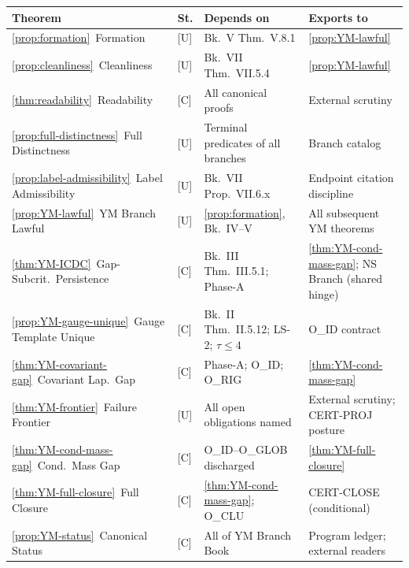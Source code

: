 \documentclass[12pt,oneside]{amsbook}
\theoremstyle{plain}
\theoremstyle{definition}
\theoremstyle{remark}
\begin{document}
\renewcommand{\arraystretch}{1.4}
\noindent
\begin{tabular}{@{}p{4.0cm}p{0.8cm}p{3.4cm}p{4.4cm}@{}}
\hline
\textbf{Theorem} & \textbf{St.} & \textbf{Depends on} & \textbf{Exports to} \\
\hline
\ref{prop:formation}\ Formation
 & [U] & Bk.~V Thm.~V.8.1
 & \ref{prop:YM-lawful} \\

\ref{prop:cleanliness}\ Cleanliness
 & [U] & Bk.~VII Thm.~VII.5.4
 & \ref{prop:YM-lawful} \\

\ref{thm:readability}\ Readability
 & [C] & All canonical proofs
 & External scrutiny \\

\ref{prop:full-distinctness}\ Full Distinctness
 & [U] & Terminal predicates of all branches
 & Branch catalog \\

\ref{prop:label-admissibility}\ Label Admissibility
 & [U] & Bk.~VII Prop.~VII.6.x
 & Endpoint citation discipline \\

\ref{prop:YM-lawful}\ YM Branch Lawful
 & [U] & \ref{prop:formation}, Bk.~IV--V
 & All subsequent YM theorems \\

\ref{thm:YM-ICDC}\ Gap-Subcrit.\ Persistence
 & [C] & Bk.~III Thm.~III.5.1; Phase-A
 & \ref{thm:YM-cond-mass-gap}; NS Branch (shared hinge) \\

\ref{prop:YM-gauge-unique}\ Gauge Template Unique
 & [C] & Bk.~II Thm.~II.5.12; LS-2; $\tau \leq 4$
 & O\_ID contract \\

\ref{thm:YM-covariant-gap}\ Covariant Lap.\ Gap
 & [C] & Phase-A; O\_ID; O\_RIG
 & \ref{thm:YM-cond-mass-gap} \\

\ref{thm:YM-frontier}\ Failure Frontier
 & [U] & All open obligations named
 & External scrutiny; CERT-PROJ posture \\

\ref{thm:YM-cond-mass-gap}\ Cond.\ Mass Gap
 & [C] & O\_ID--O\_GLOB discharged
 & \ref{thm:YM-full-closure} \\

\ref{thm:YM-full-closure}\ Full Closure
 & [C] & \ref{thm:YM-cond-mass-gap}; O\_CLU
 & CERT-CLOSE (conditional) \\

\ref{prop:YM-status}\ Canonical Status
 & [C] & All of YM Branch Book
 & Program ledger; external readers \\
\hline
\end{tabular}
\renewcommand{\arraystretch}{1}
\end{document}
